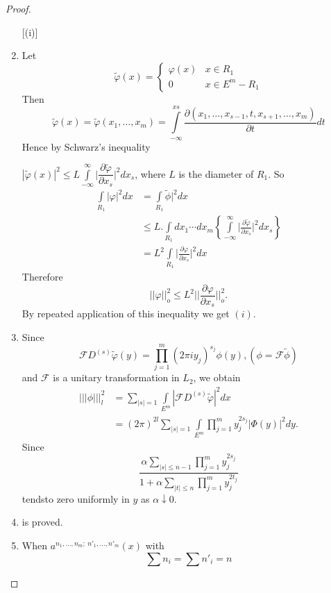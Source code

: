 \begin{proof}
 \begin{enumerate} [(i)]
 \item Let\pageoriginale
  $$
  \tilde{\varphi}(x) = 
  \begin{cases}
   \varphi(x) & x \in R_1\\
   0 & x \in E^m - R_1
  \end{cases}
  $$
  Then  
  $$
  \tilde{\varphi}(x) = \tilde{\varphi} (x_1, \ldots, x_m) =
  \int\limits_{-\infty}^{x s} \frac{\partial (x_1, \ldots,
   x_{s-1}, t, x_{s + 1}, \ldots, x_m)}{\partial t} dt 
  $$
  Hence by Schwarz's inequality
  
  $| \tilde{\varphi} (x) |^2 \le L \int\limits_{-\infty}^{\infty}
  \big | \dfrac{\partial \tilde{\varphi}}{\partial x_s} \big |^2
  dx_s$, where $L$ is the diameter of $R_1$. 
  So
  \begin{align*}
   \int\limits_{R_1} | \varphi |^2 dx & = \int\limits_{R_1}
   \tilde{\phi} |^2 dx\\ 
   & \le L. \int\limits_{R_1} dx_1 \cdots dx_m \left \{
   \int\limits_{- \infty}^{\infty} \big | \frac{\partial
    \tilde{\varphi}}{\partial x_s} \big |^2 dx_s \right\}\\ 
   & = L^2 \int\limits_{R_1} \big | \frac{\partial
    \varphi}{\partial x_s} \big |^2 dx 
  \end{align*}
  Therefore
  $$
  || \varphi ||^2_o \le L^2 || \frac{\partial \varphi}{\partial x_s}
  ||_o^2. 
  $$
  By repeated application of this inequality we get $(i)$.
 \item Since
  $$
  \mathscr{F} D^{(s)} \tilde{\varphi} (y) = \prod^m_{j = 1} (2 \pi i
  y_j)^{s_j} \phi(y), (\phi = \mathscr{F} \tilde{\phi}) 
  $$
  and $\mathscr{F}$ is a unitary transformation in $L_2$, we obtain
  \begin{align*}
   ||| \phi |||^2_l & = \sum_{ | s | = 1} \int\limits_{E^m} |
   \mathscr{F} D^{(s)} \tilde{\varphi} |^2 dx\\ 
   & = (2 \pi)^{2l} \sum_{| s | = 1} \int\limits_{E^m} \prod^m_{j=
    1} y^{2s_j}_j | \Phi (y) |^2 dy. 
  \end{align*}
  Since 
  $$
  \frac{\alpha \sum_{| s | \le n- 1} \prod^m_{j = 1} y_j^{2s_j}}{1 +
   \alpha \sum_{ | t | \le n } \prod^m_{j = 1} y_j^{2t_j}} 
  $$
  tends\pageoriginale to zero uniformly in $y$ as $\alpha \downarrow 0$.
 \item is proved.
 \item When $a^{n_1, \ldots, n_m;~ n'_1, \ldots, n'_m}(x)$ with
  $$
  \sum n_i = \sum n'_i = n
$$
\end{enumerate}
\end{proof}
